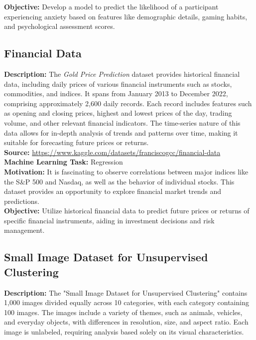 \documentclass{article}
\begin{document}
\textbf{Objective:} Develop a model to predict the likelihood of a participant experiencing anxiety based on features like demographic details, gaming habits, and psychological assessment scores.

\subsection{Financial Data}
\textbf{Description:} 
The \textit{Gold Price Prediction} dataset provides historical financial data, including daily prices of various financial instruments such as stocks, commodities, and indices. It spans from January 2013 to December 2022, comprising approximately 2,600 daily records. Each record includes features such as opening and closing prices, highest and lowest prices of the day, trading volume, and other relevant financial indicators. The time-series nature of this data allows for in-depth analysis of trends and patterns over time, making it suitable for forecasting future prices or returns. \\

\textbf{Source:} \href{https://www.kaggle.com/datasets/franciscogcc/financial-data}{https://www.kaggle.com/datasets/franciscogcc/financial-data} \\

\textbf{Machine Learning Task:} Regression \\

\textbf{Motivation:} It is fascinating to observe correlations between major indices like the S\&P 500 and Nasdaq, as well as the behavior of individual stocks. This dataset provides an opportunity to explore financial market trends and predictions. \\

\textbf{Objective:} Utilize historical financial data to predict future prices or returns of specific financial instruments, aiding in investment decisions and risk management. \\

\subsection{Small Image Dataset for Unsupervised Clustering}
\textbf{Description:} 
The "Small Image Dataset for Unsupervised Clustering" contains 1,000 images divided equally across 10 categories, with each category containing 100 images. The images include a variety of themes, such as animals, vehicles, and everyday objects, with differences in resolution, size, and aspect ratio. Each image is unlabeled, requiring analysis based solely on its visual characteristics.\\
\end{document}
